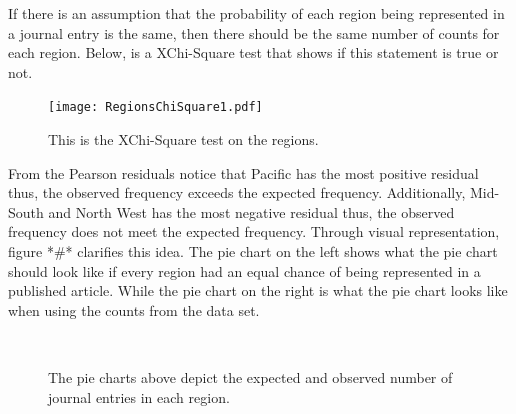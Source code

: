 \documentclass[12pt, letterpaper]{article}
\begin{document}
If there is an assumption that the probability of each region being represented in a journal entry is the same, then there should be the same number of counts for each region. Below, is a XChi-Square test that shows if this statement is true or not. 

\begin{figure}[h]
\begin{center}
\texttt{[image: RegionsChiSquare1.pdf]}
\label{fig: Region XChi-Square}
\caption{This is the XChi-Square test on the regions.}
\end{center}
\end{figure}

From the Pearson residuals notice that Pacific has the most positive residual thus, the observed frequency exceeds the expected frequency. Additionally, Mid-South and North West has the most negative residual thus, the observed frequency does not meet the expected frequency. Through visual representation, figure *#* clarifies this idea. The pie chart on the left shows what the pie chart should look like if every region had an equal chance of being represented in a published article. While the pie chart on the right is what the pie chart looks like when using the counts from the data set. 

\begin{figure}[h]
\begin{center}
\includegraphics[width=0.10]{RegionsPieChart.pdf}
\label{fig: Region Pie Chart}
\caption{The pie charts above depict the expected and observed number of journal entries in each region.}
\end{center}
\end{figure}
\end{document}
